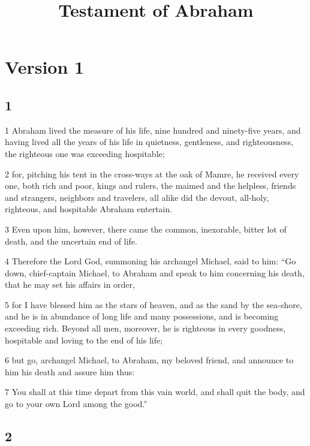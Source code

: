 

\title{Testament of Abraham}

\part{Version 1}

\chapter{1}

\par 1 Abraham lived the measure of his life, nine hundred and ninety-five years, and having lived all the years of his life in quietness, gentleness, and righteousness, the righteous one was exceeding hospitable; 

\par 2 for, pitching his tent in the cross-ways at the oak of Mamre, he received every one, both rich and poor, kings and rulers, the maimed and the helpless, friends and strangers, neighbors and travelers, all alike did the devout, all-holy, righteous, and hospitable Abraham entertain. 

\par 3 Even upon him, however, there came the common, inexorable, bitter lot of death, and the uncertain end of life. 

\par 4 Therefore the Lord God, summoning his archangel Michael, said to him: “Go down, chief-captain Michael, to Abraham and speak to him concerning his death, that he may set his affairs in order, 

\par 5 for I have blessed him as the stars of heaven, and as the sand by the sea-shore, and he is in abundance of long life and many possessions, and is becoming exceeding rich. Beyond all men, moreover, he is righteous in every goodness, hospitable and loving to the end of his life; 

\par 6 but go, archangel Michael, to Abraham, my beloved friend, and announce to him his death and assure him thus: 

\par 7 You shall at this time depart from this vain world, and shall quit the body, and go to your own Lord among the good.”

\chapter{2}

